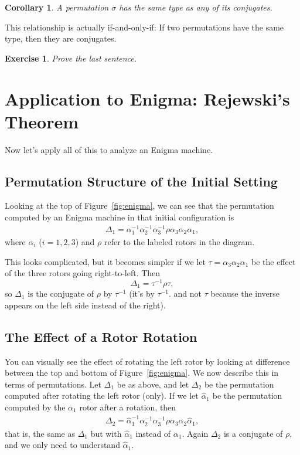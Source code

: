 \documentclass[11pt]{article}
\newtheorem{corollary}{Corollary}
\newtheorem{exercise}{Exercise}
\newcommand{\hatalpha}{\hat{\alpha}}
\begin{document}
\begin{corollary}\label{cor:conjtype}
    A permutation $\sigma$ has the same type as any of its conjugates.
\end{corollary}
This relationship is actually if-and-only-if: If two permutations have the
same type, then they are conjugates.
\begin{exercise}
    Prove the last sentence.
\end{exercise}


\section{Application to Enigma: Rejewski's Theorem}

Now let's apply all of this to analyze an Enigma machine.

\subsection{Permutation Structure of the Initial Setting}
Looking at the top
of Figure~\ref{fig:enigma}, we can see that the permutation computed by an
Enigma machine in that initial configuration is
\begin{align}\label{eq:enigmaperm1}
    \Delta_1 = \alpha_1^{-1}\alpha_2^{-1}\alpha_3^{-1}\rho
    \alpha_3\alpha_2\alpha_1,
\end{align}
where $\alpha_i$ ($i=1,2,3$) and $\rho$ refer to the labeled
rotors in the diagram.

This looks complicated, but it becomes simpler if we let
$\tau=\alpha_3\alpha_2\alpha_1$ be the effect of the three rotors going
right-to-left. Then
\[
    \Delta_1 = \tau^{-1}\rho\tau,
\]
so $\Delta_1$ is the conjugate of $\rho$ by $\tau^{-1}$ (it's by $\tau^{-1}$.
and not $\tau$ because the inverse appears on the left side instead of the
right).

\subsection{The Effect of a Rotor Rotation}

You can visually see the effect of rotating the left rotor by looking at
difference between the top and bottom of Figure~\ref{fig:enigma}. We now
describe this in terms of permutations. Let $\Delta_1$ be as above, and let
$\Delta_2$ be the permutation computed after rotating the left rotor (only).
If we let $\hatalpha_1$ be the permutation computed by the $\alpha_1$ rotor
after a rotation, then
\begin{align}\label{eq:enigmaperm2}
    \Delta_2 = \hatalpha_1^{-1}\alpha_2^{-1}\alpha_3^{-1}\rho
    \alpha_3\alpha_2\hatalpha_1,
\end{align}
that is, the same as $\Delta_1$ but with $\hatalpha_1$ instead of $\alpha_1$.
Again $\Delta_2$ is a conjugate of $\rho$, and we only need to understand
$\hatalpha_1$.
\end{document}
